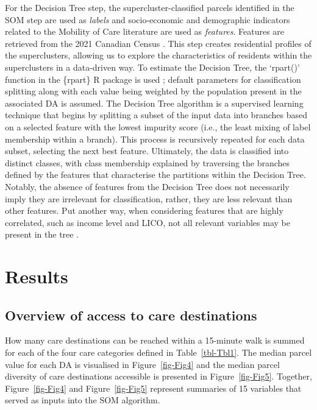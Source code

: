\documentclass[
  authoryear,
  preprint,
  3p]{elsarticle}
\begin{document}
For the Decision Tree step, the supercluster-classified parcels
identified in the SOM step are used as \emph{labels} and socio-economic
and demographic indicators related to the Mobility of Care literature
are used as \emph{features}. Features are retrieved from the 2021
Canadian Census \citep{governmentofcanadaCensusPopulation2023}. This
step creates residential profiles of the superclusters, allowing us to
explore the characteristics of residents within the superclusters in a
data-driven way. To estimate the Decision Tree, the `rpart()' function
in the \{rpart\} R package is used \citep{Therneau2023}; default
parameters for classification splitting along with each value being
weighted by the population present in the associated DA is assumed. The
Decision Tree algorithm is a supervised learning technique that begins
by splitting a subset of the input data into branches based on a
selected feature with the lowest impurity score (i.e., the least mixing
of label membership within a branch). This process is recursively
repeated for each data subset, selecting the next best feature.
Ultimately, the data is classified into distinct classes, with class
membership explained by traversing the branches defined by the features
that characterise the partitions within the Decision Tree. Notably, the
absence of features from the Decision Tree does not necessarily imply
they are irrelevant for classification, rather, they are less relevant
than other features. Put another way, when considering features that are
highly correlated, such as income level and LICO, not all relevant
variables may be present in the tree
\citep{victorianoTimeSpaceMoney2020}.

\section{Results}\label{results}

\subsection{Overview of access to care
destinations}\label{overview-of-access-to-care-destinations}

How many care destinations can be reached within a 15-minute walk is
summed for each of the four care categories defined in
Table~\ref{tbl-Tbl1}. The median parcel value for each DA is visualised
in Figure~\ref{fig-Fig4} and the median parcel diversity of care
destinations accessible is presented in Figure~\ref{fig-Fig5}. Together,
Figure~\ref{fig-Fig4} and Figure~\ref{fig-Fig5} represent summaries of
15 variables that served as inputs into the SOM algorithm.
\end{document}
